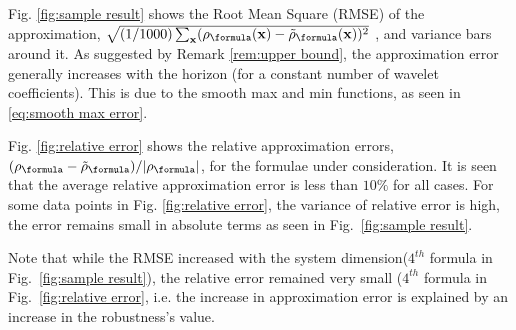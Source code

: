Fig. \ref{fig:sample result} shows the Root Mean Square (RMSE) of the approximation, $\sqrt{(1/1000)\sum_{\sstraj}(\robf(\sstraj)-\srobf(\sstraj))^2}$
, and variance bars around it.
As suggested by Remark \ref{rem:upper bound}, the approximation error generally increases with the horizon (for a constant number of wavelet coefficients).
This is due to the smooth max and min functions, as seen in \eqref{eq:smooth max error}.

Fig. \ref{fig:relative error} shows the relative approximation errors, $(\robf-\srobf)/|\robf|$, for the formulae under consideration. 
It is seen that the average relative approximation error is less than $10\%$ for all cases. 
For some data points in Fig. \ref{fig:relative error}, the variance of relative error is high, the error remains small in absolute terms as seen in Fig.~\ref{fig:sample result}.




Note that while the RMSE  increased with the system dimension($4^{th}$ formula in Fig.~\ref{fig:sample result}), the relative error remained very small ($4^{th}$ formula in Fig.~\ref{fig:relative error}, i.e. the increase in approximation error is explained by an increase in the robustness's value. 

